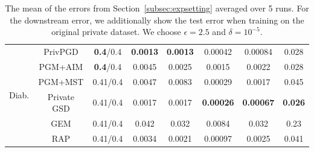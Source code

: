 \begin{table}[ht]
\begin{tabular}{cccccccc}
\multirow{6}{*}{Diab. }  & PrivPGD&\textbf{0.4}/0.4 & \textbf{0.0013} & \textbf{0.0013} & 0.00042 & 0.00084 & 0.028 \\
 & PGM+AIM&\textbf{0.4}/0.4 & 0.0045 & 0.0025 & 0.0015 & 0.0022 & 0.028 \\
 & PGM+MST&0.41/0.4 & 0.0047 & 0.0083 & 0.00029 & 0.0017 & 0.045 \\
 & Private GSD&0.41/0.4 & 0.0017 & 0.0017 & \textbf{0.00026} & \textbf{0.00067} & \textbf{0.026} \\
 & GEM&0.41/0.4 & 0.042 & 0.032 & 0.0084 & 0.032 & 0.23 \\
 & RAP&0.41/0.4 & 0.0034 & 0.0021 & 0.00097 & 0.0025 & 0.041 \\
\bottomrule
\end{tabular}
\caption{
    \small The mean of the errors from Section~\ref{subsec:expsetting}  averaged over 5 runs. For the downstream error, we additionally show the test error when training on the original private dataset. We choose $\epsilon =2.5$ and $\delta = 10^{-5}$.}
    \end{table}




